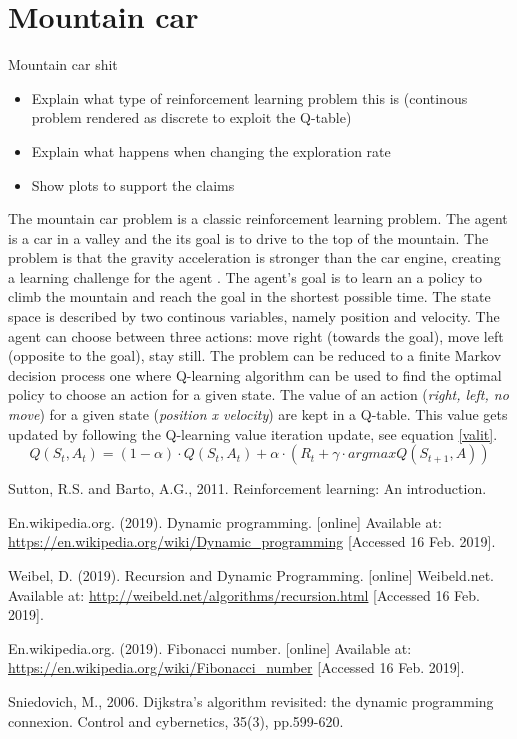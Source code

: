 \documentclass[runningheads]{llncs}
\begin{document}
\section{Mountain car}
Mountain car shit
\begin{itemize}
\item Explain what type of reinforcement learning problem this is
  (continous problem rendered as discrete to exploit the Q-table)
\item Explain what happens when changing the exploration rate
\item Show plots to support the claims
\end{itemize}
The mountain car problem is a classic reinforcement learning
problem. The agent is a car in a valley and the its goal is to drive
to the top of the mountain. The problem is that the gravity
acceleration is stronger than the car engine, creating a learning
challenge for the agent \cite{rlbook}. The agent's goal is to learn an
a policy to climb the mountain and reach the goal in the shortest
possible time. The state space is described by two continous
variables, namely position and velocity. The agent can choose between
three actions: move right (towards the goal), move left (opposite
to the goal), stay still. The problem can be reduced to a finite
Markov decision process one where Q-learning algorithm can be used to
find the optimal policy to choose an action for a given state. The
value of an action (\textit{right, left, no move}) for a given state
(\textit{position x velocity}) are kept in a Q-table. This value gets
updated by following the Q-learning value iteration update, see equation \ref{valit}.
\begin{equation}\label{valit}
Q(S_t, A_t) = (1 - \alpha) \cdot Q(S_t, A_t) + \alpha \cdot (R_t + \gamma
\cdot argmaxQ(S_{t+1}, A)) 
\end{equation}




\begin{thebibliography}{8}

Sutton, R.S. and Barto, A.G., 2011. Reinforcement learning: An introduction.

En.wikipedia.org. (2019). Dynamic programming. [online] Available at: \url{https://en.wikipedia.org/wiki/Dynamic\_programming} [Accessed 16 Feb. 2019].

Weibel, D. (2019). Recursion and Dynamic Programming. [online] Weibeld.net. Available at: \url{http://weibeld.net/algorithms/recursion.html} [Accessed 16 Feb. 2019].

En.wikipedia.org. (2019). Fibonacci number. [online] Available at: \url{https://en.wikipedia.org/wiki/Fibonacci\_number} [Accessed 16 Feb. 2019].

Sniedovich, M., 2006. Dijkstra's algorithm revisited: the dynamic programming connexion. Control and cybernetics, 35(3), pp.599-620.

\end{thebibliography}
\end{document}
